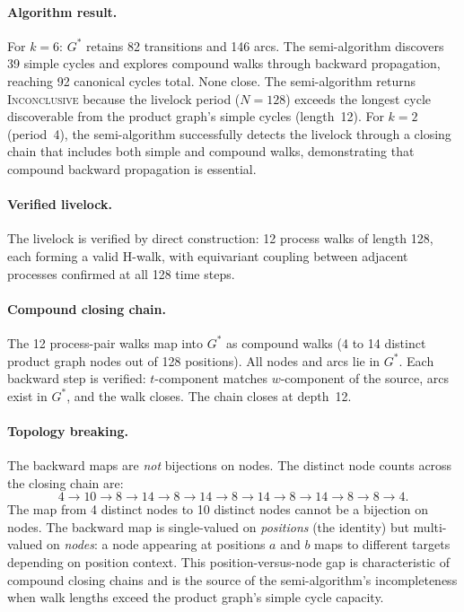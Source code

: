 \documentclass[11pt]{article}
\begin{document}
\paragraph{Algorithm result.} For $k = 6$: $G^*$ retains 82 transitions and 146 arcs. The semi-algorithm discovers 39 simple cycles and explores compound walks through backward propagation, reaching 92 canonical cycles total. None close. The semi-algorithm returns \textsc{Inconclusive} because the livelock period ($N = 128$) exceeds the longest cycle discoverable from the product graph's simple cycles (length~12). For $k = 2$ (period~4), the semi-algorithm successfully detects the livelock through a closing chain that includes both simple and compound walks, demonstrating that compound backward propagation is essential.

\paragraph{Verified livelock.} The livelock is verified by direct construction: 12 process walks of length 128, each forming a valid H-walk, with equivariant coupling between adjacent processes confirmed at all 128 time steps.

\paragraph{Compound closing chain.} The 12 process-pair walks map into $G^*$ as compound walks (4 to 14 distinct product graph nodes out of 128 positions). All nodes and arcs lie in $G^*$. Each backward step is verified: $t$-component matches $w$-component of the source, arcs exist in $G^*$, and the walk closes. The chain closes at depth~12.

\paragraph{Topology breaking.} The backward maps are \emph{not} bijections on nodes. The distinct node counts across the closing chain are:
\[
4 \to 10 \to 8 \to 14 \to 8 \to 14 \to 8 \to 14 \to 8 \to 14 \to 8 \to 8 \to 4.
\]
The map from 4 distinct nodes to 10 distinct nodes cannot be a bijection on nodes. The backward map is single-valued on \emph{positions} (the identity) but multi-valued on \emph{nodes}: a node appearing at positions $a$ and $b$ maps to different targets depending on position context. This position-versus-node gap is characteristic of compound closing chains and is the source of the semi-algorithm's incompleteness when walk lengths exceed the product graph's simple cycle capacity.
\end{document}
